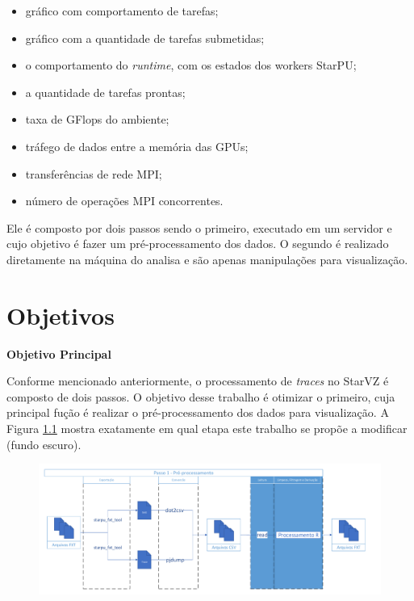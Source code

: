 \documentclass[prop-esp]{iiufrgs}
\begin{document}
\begin{itemize}
    \item gráfico com comportamento de tarefas;
    \item gráfico com a quantidade de tarefas submetidas;
    \item o comportamento do \emph{runtime}, com os estados dos workers StarPU;
    \item a quantidade de tarefas prontas;
    \item taxa de GFlops do ambiente;
    \item tráfego de dados entre a memória das GPUs;
    \item transferências de rede MPI;
    \item número de operações MPI concorrentes.
\end{itemize}

Ele é composto por dois passos sendo o primeiro, executado em um servidor e cujo objetivo é fazer um pré-processamento dos dados.
O segundo é realizado diretamente na máquina do analisa e são apenas manipulações para visualização.


%
\chapter{Objetivos}

\noindent \textbf{Objetivo Principal} 

Conforme mencionado anteriormente, o processamento de \emph{traces} no StarVZ é composto de dois passos. O objetivo desse trabalho é otimizar o primeiro, cuja principal fução é realizar o pré-processamento dos dados para visualização. A Figura \ref{fig:starvz-steps} mostra exatamente em qual etapa este trabalho se propõe a modificar (fundo escuro).

\begin{figure}[H]
 \centerline{\includegraphics[width=1\textwidth]{./images/step1-simpler.pdf}}
 \label{fig:starvz-steps}
\end{figure}
\end{document}
